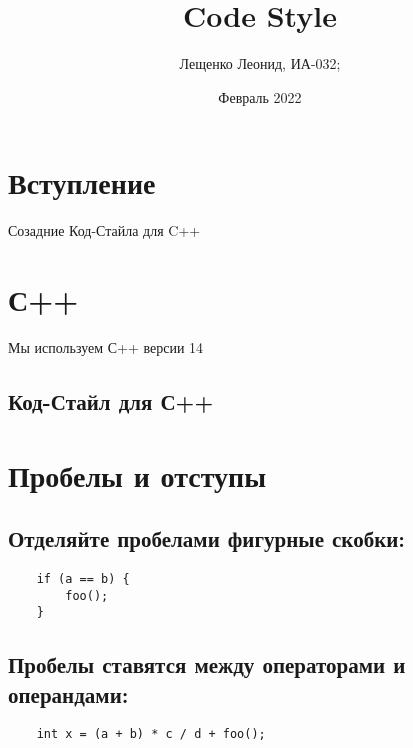 \documentclass{article}
\title{Code Style}
\author{Лещенко Леонид, ИА-032;}
\affil{СибГУТИ, email: kallygary@yandex.ru}
\date{Февраль 2022}
\begin{document}

\maketitle

\newpage
\tableofcontents

\newpage
\section{Вступление}
Созадние Код-Стайла для C++

\section{С++}
Мы используем С++ версии 14

\newpage
  \begin{center}
    \section*{Код-Стайл для С++}
  \end{center}
  
    \setcounter{section}{0}
    \section{Пробелы и отступы}
  
        \subsection{Отделяйте пробелами фигурные скобки:} 
            \begin{lstlisting}
    if (a == b) {
        foo();
    }
            \end{lstlisting}
    
        \subsection{Пробелы ставятся между операторами и\\ операндами:} 
            \begin{lstlisting}
    int x = (a + b) * c / d + foo(); 
            \end{lstlisting}
    
\end{document}
